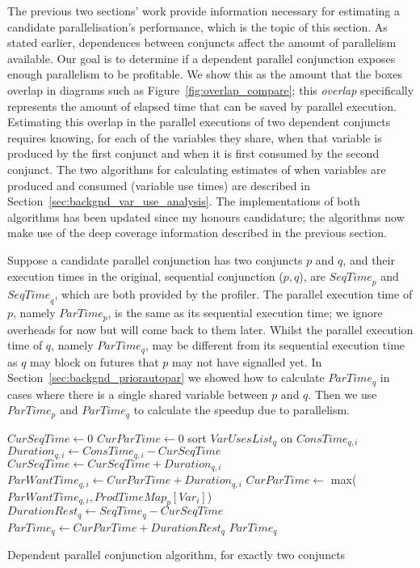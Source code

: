 
The previous two sections' work provide information necessary for
estimating a candidate parallelisation's performance,
which is the topic of this section.
As stated earlier,
dependences between conjuncts affect the amount of parallelism
available.
Our goal is to determine if a dependent parallel conjunction exposes enough
parallelism to be profitable.
We show this as the amount that the boxes overlap
in diagrams such as Figure~\ref{fig:overlap_compare};
this \emph{overlap} specifically represents the amount of elapsed time that can be
saved by parallel execution.
Estimating this overlap
in the parallel executions of two dependent conjuncts
requires knowing, for each of the variables they share,
when that variable is produced by the first conjunct and
when it is first consumed by the second conjunct.
The two algorithms for calculating estimates of when variables are produced and
consumed
(variable use times)
are described in Section~\ref{sec:backgnd_var_use_analysis}.
The implementations of both algorithms has been updated since my honours
candidature;
the algorithms now make use of the deep coverage information described in
the previous section.

Suppose a candidate parallel conjunction has two conjuncts $p$ and $q$,
and their execution times in the original, sequential conjunction ($p, q$),
are ${SeqTime}_p$ and ${SeqTime}_q$, which are both provided by the profiler.
The parallel execution time of $p$, namely $ParTime_p$,
is the same as its sequential execution time;
we ignore overheads for now but will come back to them later.
Whilst the parallel execution time of $q$, namely $ParTime_q$, may be
different from its sequential execution time as $q$ may block on futures
that $p$ may not have signalled yet.
In Section~\ref{sec:backgnd_priorautopar} we showed how to calculate
$ParTime_q$ in cases where there is a single shared variable between $p$ and
$q$.
Then we use $ParTime_p$ and $ParTime_q$ to calculate the speedup due to
parallelism.

\begin{algorithm}[tbp]
\begin{algorithmic}[5]
\State $CurSeqTime \gets 0$
\State $CurParTime \gets 0$
\State sort $VarUsesList_q$ on $ConsTime_{q, i}$
    \State $Duration_{q, i} \gets ConsTime_{q, i} - CurSeqTime$
    \State $CurSeqTime \gets CurSeqTime + Duration_{q, i}$
    \State $ParWantTime_{q, i} \gets CurParTime + Duration_{q, i}$
    \State $CurParTime \gets$ max($ParWantTime_{q, i}, ProdTimeMap_{p}[Var_i]$)
\EndFor
\State $DurationRest_q \gets SeqTime_q - CurSeqTime$
\State $ParTime_q \gets CurParTime + DurationRest_q$
\State \Return $ParTime_q$
\EndProcedure
\end{algorithmic}
\caption{Dependent parallel conjunction algorithm, for exactly two conjuncts}
\label{alg:dep_par_conj_overlap_simple}
\end{algorithm}

